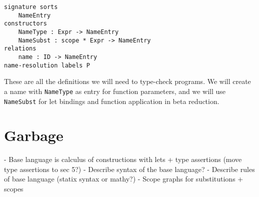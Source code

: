 \begin{lstlisting}
signature sorts
	NameEntry
constructors
	NameType : Expr -> NameEntry
	NameSubst : scope * Expr -> NameEntry
relations
	name : ID -> NameEntry
name-resolution	labels P
\end{lstlisting}

These are all the definitions we will need to type-check programs. We will create a name with \verb|NameType| as entry for function parameters, and we will use \verb|NameSubst| for let bindings and function application in beta reduction.








\section{Garbage}

- Base language is calculus of constructions with lets + type assertions (move type assertions to sec 5?)
- Describe syntax of the base language?
- Describe rules of base language (statix syntax or mathy?)
- Scope graphs for substitutions + scopes
